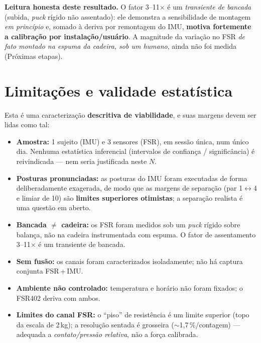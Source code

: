 \documentclass[12pt,a4paper]{article}
\begin{document}
\noindent\textbf{Leitura honesta deste resultado.} O fator 3--11$\times$ é um
\emph{transiente de bancada} (subida, \emph{puck} rígido não assentado): ele
demonstra a sensibilidade de montagem \emph{em princípio} e, somado à deriva por
remontagem do IMU, \textbf{motiva fortemente a calibração por instalação/usuário}.
A magnitude da variação no FSR \emph{de fato montado na espuma da cadeira, sob um
humano}, ainda não foi medida (Próximas etapas).

\section{Limitações e validade estatística}
\label{sec:limitacoes}
Esta é uma caracterização \textbf{descritiva de viabilidade}, e suas margens devem
ser lidas como tal:
\begin{itemize}[nosep]
  \item \textbf{Amostra:} 1 sujeito (IMU) e 3 sensores (FSR), em sessão única, num
        único dia. Nenhuma estatística inferencial (intervalos de confiança /
        significância) é reivindicada --- nem seria justificada neste $N$.
  \item \textbf{Posturas pronunciadas:} as posturas do IMU foram executadas de forma
        deliberadamente exagerada, de modo que as margens de separação (par
        1{$\leftrightarrow$}4 e limiar de 10\degree{}) são \textbf{limites
        superiores otimistas}; a separação realista é uma questão em aberto.
  \item \textbf{Bancada $\neq$ cadeira:} os FSR foram medidos sob um \emph{puck}
        rígido sobre balança, não na cadeira instrumentada com espuma. O fator de
        assentamento 3--11$\times$ é um transiente de bancada.
  \item \textbf{Sem fusão:} os canais foram caracterizados isoladamente; não há
        captura conjunta FSR\,+\,IMU.
  \item \textbf{Ambiente não controlado:} temperatura e horário não foram fixados; o
        FSR402 deriva com ambos.
  \item \textbf{Limites do canal FSR:} o ``piso'' de resistência é um limite superior
        (topo da escala de 2\,kg); a resolução sentada é grosseira
        ($\sim$1{,}7\,\%/contagem) --- adequada a \emph{contato/pressão relativa},
        não a força calibrada.
\end{itemize}

\end{document}
